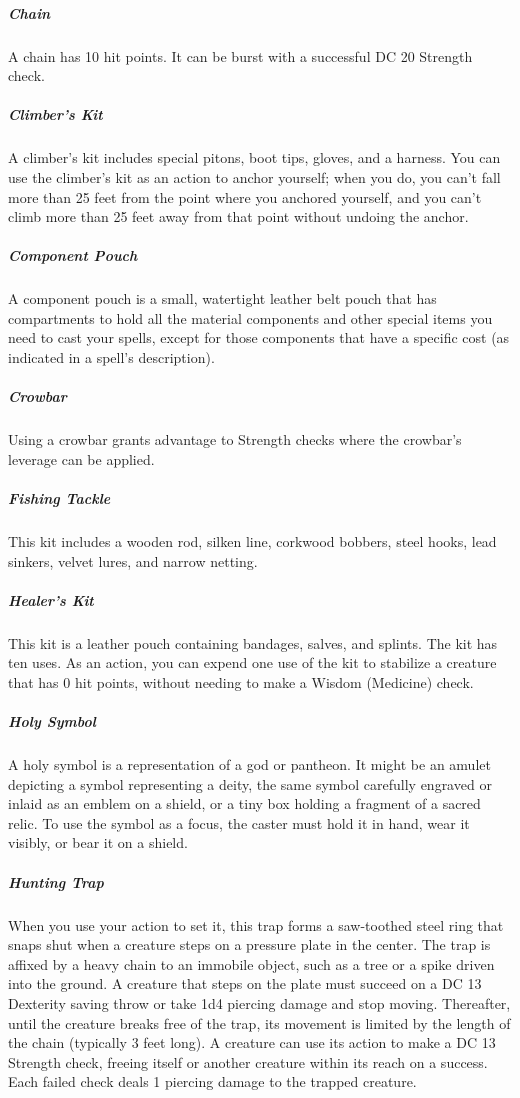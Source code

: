 \subparagraph*{Chain} A chain has 10 hit points. It can be burst with a successful DC 20 Strength check.

\subparagraph*{Climber's Kit} A climber's kit includes special pitons, boot tips, gloves, and a harness. You can use the climber's kit as an action to anchor yourself; when you do, you can't fall more than 25 feet from the point where you anchored yourself, and you can't climb more than 25 feet away from that point without undoing the anchor.

\subparagraph*{Component Pouch} A component pouch is a small, watertight leather belt pouch that has compartments to hold all the material components and other special items you need to cast your spells, except for those components that have a specific cost (as indicated in a spell's description).
\subparagraph*{Crowbar} Using a crowbar grants advantage to Strength checks where the crowbar's leverage can be applied.

\subparagraph*{Fishing Tackle} This kit includes a wooden rod, silken line, corkwood bobbers, steel hooks, lead sinkers, velvet lures, and narrow netting.
\subparagraph*{Healer's Kit} This kit is a leather pouch containing bandages, salves, and splints. The kit has ten uses. As an action, you can expend one use of the kit to stabilize a creature that has 0 hit points, without needing to make a Wisdom (Medicine) check.

\subparagraph*{Holy Symbol} A holy symbol is a representation of a god or pantheon. It might be an amulet depicting a symbol representing a deity, the same symbol carefully engraved or inlaid as an emblem on a shield, or a tiny box holding a fragment of a sacred relic. To use the symbol as a focus, the caster must hold it in hand, wear it visibly, or bear it on a shield.

\subparagraph*{Hunting Trap} When you use your action to set it, this trap forms a saw-toothed steel ring that snaps shut when a creature steps on a pressure plate in the center. The trap is affixed by a heavy chain to an immobile object, such as a tree or a spike driven into the ground. A creature that steps on the plate must succeed on a DC 13 Dexterity saving throw or take 1d4 piercing damage and stop moving. Thereafter, until the creature breaks free of the trap, its movement is limited by the length of the chain (typically 3 feet long). A creature can use its action to make a DC 13 Strength check, freeing itself or another creature within its reach on a success. Each failed check deals 1 piercing damage to the trapped creature.

